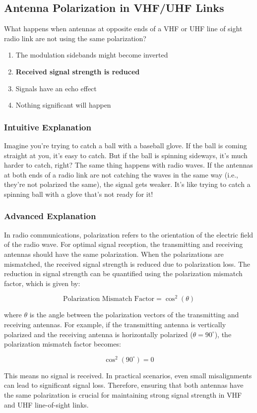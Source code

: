 \subsection{Antenna Polarization in VHF/UHF Links}
\label{T3A04}

\begin{tcolorbox}[colback=gray!10!white,colframe=black!75!black,title=T3A04]
What happens when antennas at opposite ends of a VHF or UHF line of sight radio link are not using the same polarization?
\begin{enumerate}[label=\Alph*]
    \item The modulation sidebands might become inverted
    \item \textbf{Received signal strength is reduced}
    \item Signals have an echo effect
    \item Nothing significant will happen
\end{enumerate}
\end{tcolorbox}

\subsubsection{Intuitive Explanation}
Imagine you’re trying to catch a ball with a baseball glove. If the ball is coming straight at you, it’s easy to catch. But if the ball is spinning sideways, it’s much harder to catch, right? The same thing happens with radio waves. If the antennas at both ends of a radio link are not catching the waves in the same way (i.e., they’re not polarized the same), the signal gets weaker. It’s like trying to catch a spinning ball with a glove that’s not ready for it!

\subsubsection{Advanced Explanation}
In radio communications, polarization refers to the orientation of the electric field of the radio wave. For optimal signal reception, the transmitting and receiving antennas should have the same polarization. When the polarizations are mismatched, the received signal strength is reduced due to polarization loss. The reduction in signal strength can be quantified using the polarization mismatch factor, which is given by:

\[
\text{Polarization Mismatch Factor} = \cos^2(\theta)
\]

where \(\theta\) is the angle between the polarization vectors of the transmitting and receiving antennas. For example, if the transmitting antenna is vertically polarized and the receiving antenna is horizontally polarized (\(\theta = 90^\circ\)), the polarization mismatch factor becomes:

\[
\cos^2(90^\circ) = 0
\]

This means no signal is received. In practical scenarios, even small misalignments can lead to significant signal loss. Therefore, ensuring that both antennas have the same polarization is crucial for maintaining strong signal strength in VHF and UHF line-of-sight links.

